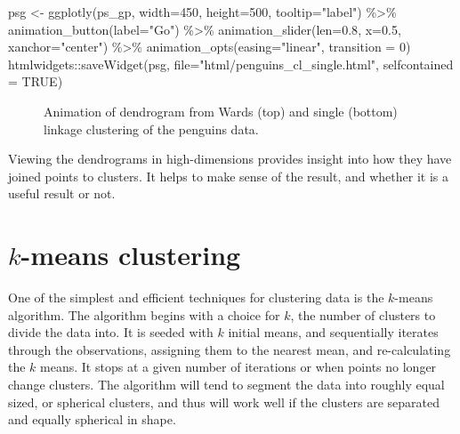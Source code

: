 \documentclass[
  letterpaper,
]{book}
\newenvironment{Shaded}{\begin{snugshade}}{\end{snugshade}}
\newcommand{\AttributeTok}[1]{\textcolor[rgb]{0.40,0.45,0.13}{#1}}
\newcommand{\ConstantTok}[1]{\textcolor[rgb]{0.56,0.35,0.01}{#1}}
\newcommand{\DecValTok}[1]{\textcolor[rgb]{0.68,0.00,0.00}{#1}}
\newcommand{\FloatTok}[1]{\textcolor[rgb]{0.68,0.00,0.00}{#1}}
\newcommand{\FunctionTok}[1]{\textcolor[rgb]{0.28,0.35,0.67}{#1}}
\newcommand{\NormalTok}[1]{\textcolor[rgb]{0.00,0.23,0.31}{#1}}
\newcommand{\OtherTok}[1]{\textcolor[rgb]{0.00,0.23,0.31}{#1}}
\newcommand{\SpecialCharTok}[1]{\textcolor[rgb]{0.37,0.37,0.37}{#1}}
\newcommand{\StringTok}[1]{\textcolor[rgb]{0.13,0.47,0.30}{#1}}
\begin{document}
\begin{Shaded}
\begin{Highlighting}[]
\NormalTok{psg }\OtherTok{\textless{}{-}} \FunctionTok{ggplotly}\NormalTok{(ps\_gp, }\AttributeTok{width=}\DecValTok{450}\NormalTok{, }\AttributeTok{height=}\DecValTok{500}\NormalTok{,}
                \AttributeTok{tooltip=}\StringTok{"label"}\NormalTok{) }\SpecialCharTok{\%\textgreater{}\%}
       \FunctionTok{animation\_button}\NormalTok{(}\AttributeTok{label=}\StringTok{"Go"}\NormalTok{) }\SpecialCharTok{\%\textgreater{}\%}
       \FunctionTok{animation\_slider}\NormalTok{(}\AttributeTok{len=}\FloatTok{0.8}\NormalTok{, }\AttributeTok{x=}\FloatTok{0.5}\NormalTok{,}
                        \AttributeTok{xanchor=}\StringTok{"center"}\NormalTok{) }\SpecialCharTok{\%\textgreater{}\%}
       \FunctionTok{animation\_opts}\NormalTok{(}\AttributeTok{easing=}\StringTok{"linear"}\NormalTok{, }\AttributeTok{transition =} \DecValTok{0}\NormalTok{)}
\NormalTok{htmlwidgets}\SpecialCharTok{::}\FunctionTok{saveWidget}\NormalTok{(psg,}
          \AttributeTok{file=}\StringTok{"html/penguins\_cl\_single.html"}\NormalTok{,}
          \AttributeTok{selfcontained =} \ConstantTok{TRUE}\NormalTok{)}
\end{Highlighting}
\end{Shaded}

\begin{figure}

{\centering 

}

\caption{\label{fig-penguins-hfly-plotly}Animation of dendrogram from
Wards (top) and single (bottom) linkage clustering of the penguins
data.}

\end{figure}

Viewing the dendrograms in high-dimensions provides insight into how
they have joined points to clusters. It helps to make sense of the
result, and whether it is a useful result or not.

\hypertarget{k-means-clustering}{%
\chapter{\texorpdfstring{\(k\)-means
clustering}{k-means clustering}}\label{k-means-clustering}}

One of the simplest and efficient techniques for clustering data is the
\(k\)-means algorithm. The algorithm begins with a choice for \(k\), the
number of clusters to divide the data into. It is seeded with \(k\)
initial means, and sequentially iterates through the observations,
assigning them to the nearest mean, and re-calculating the \(k\) means.
It stops at a given number of iterations or when points no longer change
clusters. The algorithm will tend to segment the data into roughly equal
sized, or spherical clusters, and thus will work well if the clusters
are separated and equally spherical in shape.
\end{document}
